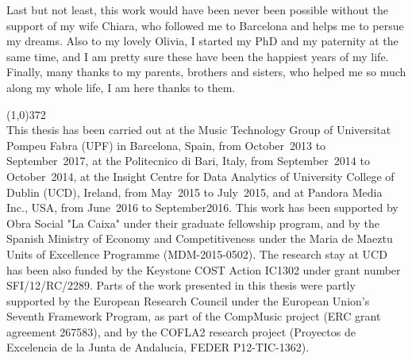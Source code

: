 Last but not least, this work would have been never been possible without the support of my wife Chiara, who followed me to Barcelona and helps me to persue my dreams. Also to my lovely Olivia, I started my PhD and my paternity at the same time, and I am pretty sure these have been the happiest years of my life. Finally, many thanks to my parents, brothers and sisters, who helped me so much along my whole life, I am here thanks to them.

\vspace*{\fill}

\line(1,0){372}\\
\footnotesize
This thesis has been carried out at the Music Technology Group of Universitat Pompeu Fabra (UPF) in Barcelona, Spain, from October~2013 to September~2017, at the Politecnico di Bari, Italy, from September~2014 to October~2014, at the Insight Centre for Data Analytics of University College of Dublin (UCD), Ireland, from May~2015 to July~2015, and at Pandora Media Inc., USA, from June~2016 to September2016. This work has been supported by Obra Social "La Caixa" under their graduate fellowship program, and by the Spanish Ministry of Economy and Competitiveness under the Maria de Maeztu Units of Excellence Programme (MDM-2015-0502). The research stay at UCD has been also funded by the Keystone COST Action IC1302 under grant number SFI/12/RC/2289. Parts of the work presented in this thesis were partly supported by the European Research Council under the European Union's Seventh Framework Program, as part of the CompMusic project (ERC grant agreement 267583), and by the COFLA2 research project (Proyectos de Excelencia de la Junta de Andalucia, FEDER P12-TIC-1362).
\normalsize